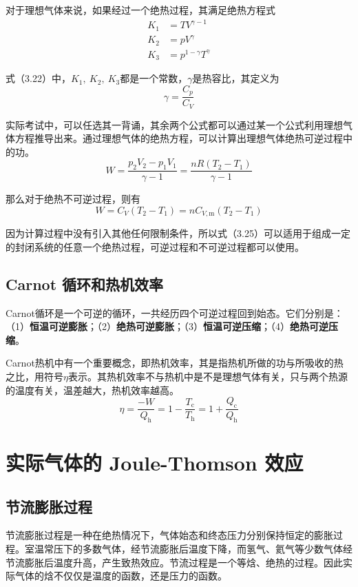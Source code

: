 \documentclass[lang=cn,newtx,11pt,scheme=chinese]{elegantbook}
\begin{document}
对于理想气体来说，如果经过一个绝热过程，其满足绝热方程式
\begin{equation}
	\begin{aligned}
		K_1 &=  TV^{\gamma -1}  \\[1.5ex]
		K_2 &=  pV^{\gamma}  \\[1.5ex]
		K_3 &= p^{1-\gamma}T^{\gamma} 
	\end{aligned}
\end{equation}

式（3.22）中，$K_1,\ K_2,\ K_3$都是一个常数，$\gamma$是热容比，其定义为
\begin{equation}
	\gamma = \frac{C_p}{C_V}
\end{equation}

实际考试中，可以任选其一背诵，其余两个公式都可以通过某一个公式利用理想气体方程推导出来。通过理想气体的绝热方程，可以计算出理想气体绝热可逆过程中的功。
\begin{equation}
	W =\frac{p_2V_2-p_1V_1}{\gamma -1} = \frac{nR(T_2-T_1)}{\gamma -1}
\end{equation}

那么对于绝热不可逆过程，则有
\begin{equation}
	W=C_V(T_2-T_1)=nC_{V,\mathrm{m}}(T_2-T_1)
\end{equation}

因为计算过程中没有引入其他任何限制条件，所以式（3.25）可以适用于组成一定的封闭系统的任意一个绝热过程，可逆过程和不可逆过程都可以使用。

\subsection{Carnot 循环和热机效率}
Carnot循环是一个可逆的循环，一共经历四个可逆过程回到始态。它们分别是：（1）\textbf{恒温可逆膨胀}；（2）\textbf{绝热可逆膨胀}；（3）\textbf{恒温可逆压缩}；（4）\textbf{绝热可逆压缩}。

Carnot热机中有一个重要概念，即热机效率，其是指热机所做的功与所吸收的热之比，用符号$\eta$表示。其热机效率不与热机中是不是理想气体有关，只与两个热源的温度有关，温差越大，热机效率越高。
\begin{equation}
	\eta = \frac{-W}{Q_\mathrm{h}}=1-\frac{T_\mathrm{c}}{T_\mathrm{h}} = 1+\frac{Q_\mathrm{c}}{Q_\mathrm{h}}
\end{equation}

\section{实际气体的 Joule-Thomson 效应}
\subsection{节流膨胀过程}
节流膨胀过程是一种在绝热情况下，气体始态和终态压力分别保持恒定的膨胀过程。室温常压下的多数气体，经节流膨胀后温度下降，而氢气、氦气等少数气体经节流膨胀后温度升高，产生致热效应。节流过程是一个等焓、绝热的过程。因此实际气体的焓不仅仅是温度的函数，还是压力的函数。
\end{document}
